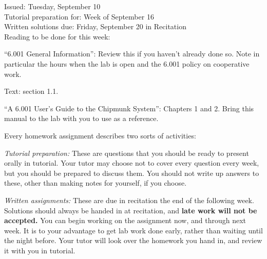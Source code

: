 



\medskip

\begin{flushleft}
Issued:  Tuesday, September 10 \\
\smallskip
Tutorial preparation for: Week of September 16 \\
\smallskip
Written solutions due: Friday, September 20 in Recitation \\
\smallskip
Reading to be done for this week:
\begin{tightlist}
\item ``6.001 General Information'': Review this if you haven't
already done so.  Note in particular the hours when the lab is open
and the 6.001 policy on cooperative work.

\item Text: section 1.1.

\item  ``A 6.001 User's Guide to the Chipmunk System'': Chapters 1
and 2.  Bring this manual to the lab with you to use as a reference.
\end{tightlist}
\end{flushleft}

\noindent
Every homework assignment describes two sorts of activities:
\begin{tightlist}

\item {\em Tutorial preparation:}  
These are questions that you should be ready to present orally in
tutorial.  Your tutor may choose not to cover every question every
week, but you should be prepared to discuss them.  You should not write
up answers to these, other than making notes for yourself, if you
choose.

\item {\em Written assignments:}
These are due in recitation the end of the following week.  Solutions
should always be handed in at recitation, and {\bf late work will not
be accepted.} You can begin working on the assignment now, and through
next week.  It is to your advantage to get lab work done early, rather
than waiting until the night before.  Your tutor will look over the
homework you hand in, and review it with you in tutorial.

\end{tightlist}

